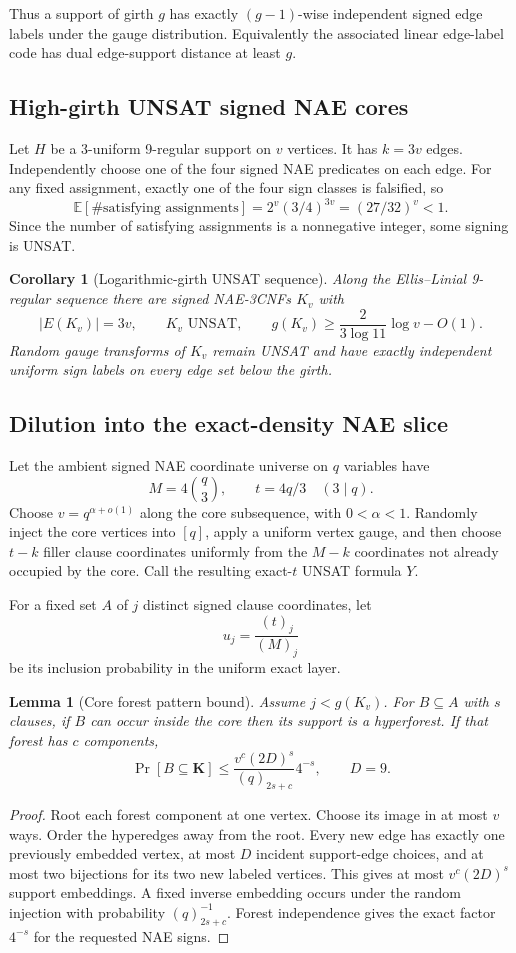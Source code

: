 \documentclass[11pt]{article}
\newtheorem{lemma}[theorem]{Lemma}
\newtheorem{corollary}[theorem]{Corollary}
\begin{document}
Thus a support of girth $g$ has exactly $(g-1)$-wise independent signed edge labels under the gauge distribution. Equivalently the associated linear edge-label code has dual edge-support distance at least $g$.

\subsection{High-girth UNSAT signed NAE cores}
Let $H$ be a 3-uniform 9-regular support on $v$ vertices. It has $k=3v$ edges. Independently choose one of the four signed NAE predicates on each edge. For any fixed assignment, exactly one of the four sign classes is falsified, so
\[\mathbb E[\#\text{satisfying assignments}]=2^v(3/4)^{3v}=(27/32)^v<1.\]
Since the number of satisfying assignments is a nonnegative integer, some signing is UNSAT.

\begin{corollary}[Logarithmic-girth UNSAT sequence]
Along the Ellis--Linial 9-regular sequence there are signed NAE-3CNFs $K_v$ with
\[|E(K_v)|=3v,\qquad K_v\text{ UNSAT},\qquad g(K_v)\ge\frac{2}{3\log11}\log v-O(1).\]
Random gauge transforms of $K_v$ remain UNSAT and have exactly independent uniform sign labels on every edge set below the girth.
\end{corollary}

\subsection{Dilution into the exact-density NAE slice}
Let the ambient signed NAE coordinate universe on $q$ variables have
\[M=4\binom q3,\qquad t=4q/3\quad(3\mid q).\]
Choose $v=q^{\alpha+o(1)}$ along the core subsequence, with $0<\alpha<1$. Randomly inject the core vertices into $[q]$, apply a uniform vertex gauge, and then choose $t-k$ filler clause coordinates uniformly from the $M-k$ coordinates not already occupied by the core. Call the resulting exact-$t$ UNSAT formula $Y$.

For a fixed set $A$ of $j$ distinct signed clause coordinates, let
\[u_j=\frac{(t)_j}{(M)_j}\]
be its inclusion probability in the uniform exact layer.

\begin{lemma}[Core forest pattern bound]
Assume $j<g(K_v)$. For $B\subseteq A$ with $s$ clauses, if $B$ can occur inside the core then its support is a hyperforest. If that forest has $c$ components,
\[\Pr[B\subseteq\mathbf K]\le\frac{v^c(2D)^s}{(q)_{2s+c}}4^{-s},\qquad D=9.\]
\end{lemma}
\begin{proof}
Root each forest component at one vertex. Choose its image in at most $v$ ways. Order the hyperedges away from the root. Every new edge has exactly one previously embedded vertex, at most $D$ incident support-edge choices, and at most two bijections for its two new labeled vertices. This gives at most $v^c(2D)^s$ support embeddings. A fixed inverse embedding occurs under the random injection with probability $(q)_{2s+c}^{-1}$. Forest independence gives the exact factor $4^{-s}$ for the requested NAE signs.
\end{proof}
\end{document}
